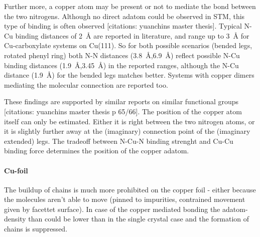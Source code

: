 Further more, a copper atom may be present or not to mediate the bond between the two nitrogens. Although no direct adatom could be observed in STM, this type of binding is often observed [citations: yuanchins master thesis]\cite{klappenberger_temperature_2008}. Typical N-Cu binding distances of \SI{2}{\angstrom} are reported in literature\cite{klappenberger_temperature_2008}, and range up to \SI{3}{\angstrom} for Cu-carboxylate systems on Cu(111)\cite{classen_templated_2005}. So for both possible scenarios (bended legs, rotated phenyl ring) both N-N distances (\SI{3.8}{\angstrom},\SI{6.9}{\angstrom}) reflect possible N-Cu binding distances (\SI{1.9}{\angstrom},\SI{3.45}{\angstrom}) in the reported ranges, although the N-Cu distance (\SI{1.9}{\angstrom}) for the bended legs matches better. Systems with copper dimers mediating the molecular connection are reported  too\cite{lin_real-time_2002}.

These findings are supported by similar reports on similar functional groups [citations: yuanchins master thesis p 65/66]. The position of the copper atom itself can only be estimated. Either it is right between the two nitrogen atoms, or it is slightly further away at the (imaginary) connection point of the (imaginary extended) legs. The tradeoff between N-Cu-N binding strenght and Cu-Cu binding force determines the position of the copper adatom.

\paragraph{Cu-foil}
The buildup of chains is much more prohibited on the copper foil - either because the molecules aren't able to move (pinned to impurities, contrained movement given by facettet surface). In case of the copper mediated bonding the adatom-density than could be lower than in the single crystal case and the formation of chains is suppressed.